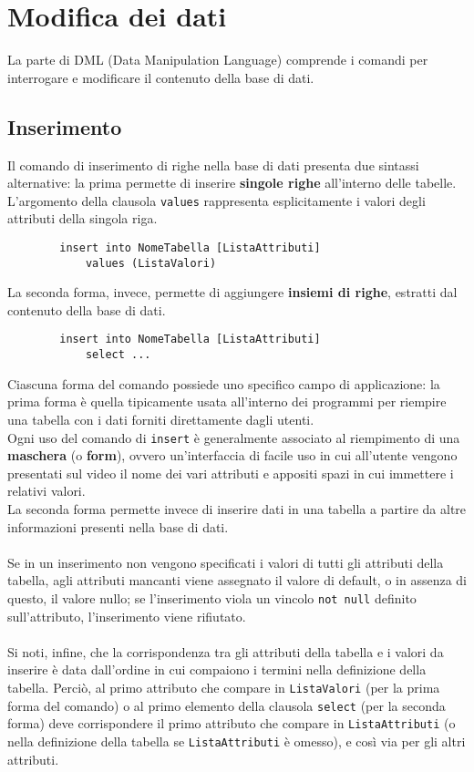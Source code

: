 \chapter{Modifica dei dati}
La parte di DML (Data Manipulation Language) comprende i comandi per interrogare e modificare il contenuto della base di dati.



\section{Inserimento}
Il comando di inserimento di righe nella base di dati presenta due sintassi alternative: la prima permette di inserire \textbf{singole righe} all'interno delle tabelle. L'argomento della clausola \texttt{values} rappresenta esplicitamente i valori degli attributi della singola riga.
	\begin{lstlisting}
		insert into NomeTabella [ListaAttributi]
			values (ListaValori)
	\end{lstlisting}
La seconda forma, invece, permette di aggiungere \textbf{insiemi di righe}, estratti dal contenuto della base di dati.
	\begin{lstlisting}
		insert into NomeTabella [ListaAttributi]
			select ...
	\end{lstlisting}
Ciascuna forma del comando possiede uno specifico campo di applicazione: la prima forma è quella tipicamente usata all'interno dei programmi per riempire una tabella con i dati forniti direttamente dagli utenti.\\
Ogni uso del comando di \texttt{insert} è generalmente associato al riempimento di una \textbf{maschera} (o \textbf{form}), ovvero un'interfaccia di facile uso in cui all'utente vengono presentati sul video il nome dei vari attributi e appositi spazi in cui immettere i relativi valori.\\
La seconda forma permette invece di inserire dati in una tabella a partire da altre informazioni presenti nella base di dati.\\\\
Se in un inserimento non vengono specificati i valori di tutti gli attributi della tabella, agli attributi mancanti viene assegnato il valore di default, o in assenza di questo, il valore nullo;  se l'inserimento viola un vincolo \texttt{not null} definito sull'attributo, l'inserimento viene rifiutato.\\\\
Si noti, infine, che la corrispondenza tra gli attributi della tabella e i valori da inserire è data dall'ordine in cui compaiono i termini nella definizione della tabella. Perciò, al primo attributo che compare in \texttt{ListaValori} (per la prima forma del comando) o al primo elemento della clausola \texttt{select} (per la seconda forma) deve corrispondere il primo attributo che compare in \texttt{ListaAttributi} (o nella definizione della tabella se \texttt{ListaAttributi} è omesso), e così via per gli altri attributi.

